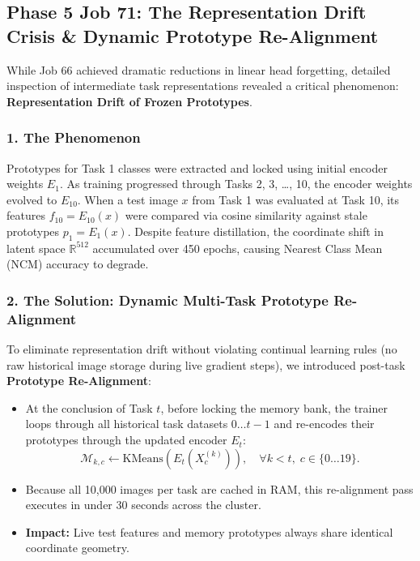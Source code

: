 \documentclass[11pt,a4paper]{article}
\begin{document}
    \subsection{Phase 5 Job 71: The Representation Drift Crisis \& Dynamic Prototype Re-Alignment}
    While Job 66 achieved dramatic reductions in linear head forgetting, detailed inspection of intermediate task representations revealed a critical phenomenon: \textbf{Representation Drift of Frozen Prototypes}.
    
    \subsubsection{1. The Phenomenon}
    Prototypes for Task 1 classes were extracted and locked using initial encoder weights $E_1$. As training progressed through Tasks 2, 3, \dots, 10, the encoder weights evolved to $E_{10}$. When a test image $x$ from Task 1 was evaluated at Task 10, its features $f_{10} = E_{10}(x)$ were compared via cosine similarity against stale prototypes $p_1 = E_1(x)$. Despite feature distillation, the coordinate shift in latent space $\mathbb{R}^{512}$ accumulated over 450 epochs, causing Nearest Class Mean (NCM) accuracy to degrade.

    \subsubsection{2. The Solution: Dynamic Multi-Task Prototype Re-Alignment}
    To eliminate representation drift without violating continual learning rules (no raw historical image storage during live gradient steps), we introduced post-task \textbf{Prototype Re-Alignment}:
    \begin{itemize}[leftmargin=*]
        \item At the conclusion of Task $t$, before locking the memory bank, the trainer loops through all historical task datasets $0 \dots t-1$ and re-encodes their prototypes through the updated encoder $E_t$:
        \begin{equation}
            \mathcal{M}_{k, c} \leftarrow \text{KMeans}(E_t(X_c^{(k)})), \quad \forall k < t, \; c \in \{0 \dots 19\}.
        \end{equation}
        \item Because all 10,000 images per task are cached in RAM, this re-alignment pass executes in under 30 seconds across the cluster.
        \item \textbf{Impact:} Live test features and memory prototypes always share identical coordinate geometry.
    \end{itemize}
\end{document}

